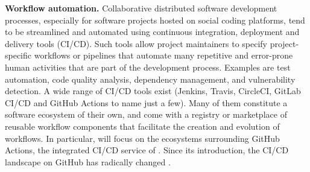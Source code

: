 \textbf{Workflow automation.} Collaborative distributed software development processes, especially for software projects hosted on social coding platforms, tend to be streamlined and automated using continuous integration, deployment and delivery tools (CI/CD). Such tools allow project maintainers to specify project-specific workflows or pipelines that automate many repetitive and error-prone human activities that are part of the development process. Examples are test automation, code quality analysis, dependency management, and vulnerability detection. A wide range of CI/CD tools exist (\eg Jenkins, Travis, CircleCI, GitLab CI/CD and GitHub Actions to name just a few). Many of them constitute a software ecosystem of their own, and come with a registry or marketplace of reusable workflow components that facilitate the creation and evolution of workflows. In particular,  will focus on the ecosystems surrounding GitHub Actions, the integrated CI/CD service of \github. Since its introduction, the CI/CD landscape on GitHub has radically changed \cite{kinsman2021software, decanuse, wessel2022github}.


